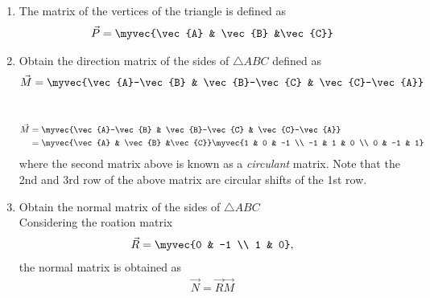 \begin{enumerate}[label=\thesubsection.\arabic*.,ref=\thesubsection.\theenumi]
	\item The matrix of the vertices of the triangle is defined as
		\begin{align}
			\vec{P} = \myvec{\vec{A} & \vec{B} &\vec{C}}
		\end{align}
\item Obtain the direction matrix of the sides of $\triangle ABC$
	defined as 
		\begin{align}
		\vec{M} = 	\myvec{\vec{A}-\vec{B} & \vec{B}-\vec{C} & \vec{C}-\vec{A}}
		\end{align}
	\\
		\solution 

		\begin{align}
			\vec{M} &= \myvec{\vec{A}-\vec{B} & \vec{B}-\vec{C} & \vec{C}-\vec{A}}
			\\
			&= 
			\myvec{\vec{A} & \vec{B} &\vec{C}}
			\myvec{1 & 0 & -1 \\ -1 & 1 & 0 \\ 0 & -1 & 1}
		\end{align}
		where the second matrix above 
		is known as a {\em circulant} matrix.  Note that the 2nd and 3rd row of the above matrix are circular shifts of the 1st row.
	\item Obtain the normal matrix  of the sides of $\triangle ABC$
		\\
		\solution Considering the roation matrix
		\begin{align}
			\vec{R}  = \myvec{0 & -1 \\ 1 & 0},
		\end{align}
		the normal matrix is obtained as
		\begin{align}
			\vec{N} = \vec{R}\vec{M} 
		\end{align}


\end{enumerate}
